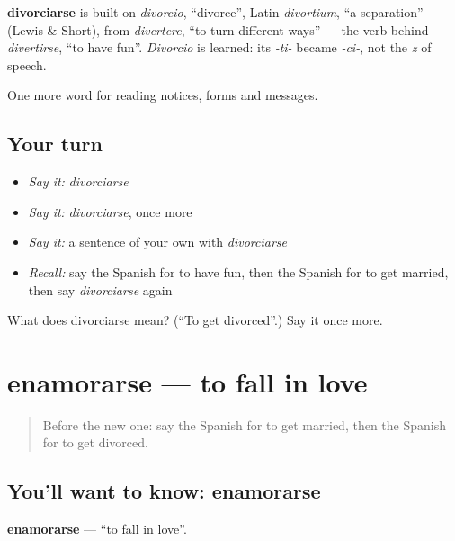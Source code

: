 \begin{cousinweb}
\textbf{divorciarse} is built on \emph{divorcio}, \textquotedblleft{}divorce\textquotedblright{}, Latin \emph{divortium}, \textquotedblleft{}a separation\textquotedblright{} (Lewis \& Short), from \emph{divertere}, \textquotedblleft{}to turn different ways\textquotedblright{} — the verb behind \emph{divertirse}, \textquotedblleft{}to have fun\textquotedblright{}. \emph{Divorcio} is learned: its \emph{-ti-} became \emph{-ci-}, not the \emph{z} of speech.
\end{cousinweb}

\begin{grammarlens}[title={What you've built}]
One more word for reading notices, forms and messages.
\end{grammarlens}

\subsection*{Your turn}
\begin{itemize}
\raggedright
  \item \emph{Say it:} \emph{divorciarse}
  \item \emph{Say it:} \emph{divorciarse}, once more
  \item \emph{Say it:} a sentence of your own with \emph{divorciarse}
  \item \emph{Recall:} say the Spanish for to have fun, then the Spanish for to get married, then say \emph{divorciarse} again
\end{itemize}

\begin{tcolorbox}[breakable,colback=teal!4,colframe=teal!35!black,title={Before you move on}]
What does divorciarse mean? (\textquotedblleft{}To get divorced\textquotedblright{}.) Say it once more.
\end{tcolorbox}
\section[enamorarse]{enamorarse — to fall in love}

\label{lesson:ES-C488-enamorarse}



\begin{quote}
Before the new one: say the Spanish for to get married, then the Spanish for to get divorced.
\end{quote}

\subsection*{You'll want to know: enamorarse}
\textbf{enamorarse} — \textquotedblleft{}to fall in love\textquotedblright{}.

